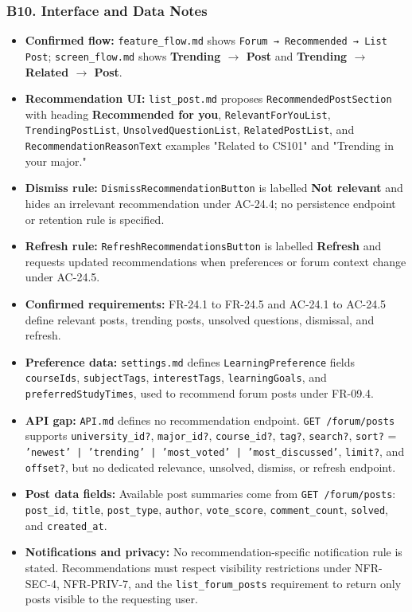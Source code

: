 \documentclass[12pt]{article}
\begin{document}
\hypertarget{sec:b10-interface-and-data-notes}{}
\subsubsection*{B10. Interface and Data Notes}
\par\medskip

\begin{itemize}
\item \textbf{Confirmed flow:} \texttt{feature\_flow.md} shows \texttt{Forum → Recommended → List Post}; \texttt{screen\_flow.md} shows \textbf{Trending $\rightarrow$ Post} and \textbf{Trending $\rightarrow$ Related $\rightarrow$ Post}.
\item \textbf{Recommendation UI:} \texttt{list\_post.md} proposes \texttt{RecommendedPostSection} with heading \textbf{Recommended for you}, \texttt{RelevantForYouList}, \texttt{TrendingPostList}, \texttt{UnsolvedQuestionList}, \texttt{RelatedPostList}, and \texttt{RecommendationReasonText} examples "Related to CS101" and "Trending in your major."
\item \textbf{Dismiss rule:} \texttt{DismissRecommendationButton} is labelled \textbf{Not relevant} and hides an irrelevant recommendation under AC-24.4; no persistence endpoint or retention rule is specified.
\item \textbf{Refresh rule:} \texttt{RefreshRecommendationsButton} is labelled \textbf{Refresh} and requests updated recommendations when preferences or forum context change under AC-24.5.
\item \textbf{Confirmed requirements:} FR-24.1 to FR-24.5 and AC-24.1 to AC-24.5 define relevant posts, trending posts, unsolved questions, dismissal, and refresh.
\item \textbf{Preference data:} \texttt{settings.md} defines \texttt{LearningPreference} fields \texttt{courseIds}, \texttt{subjectTags}, \texttt{interestTags}, \texttt{learningGoals}, and \texttt{preferredStudyTimes}, used to recommend forum posts under FR-09.4.
\item \textbf{API gap:} \texttt{API.md} defines no recommendation endpoint. \texttt{GET /forum/posts} supports \texttt{university\_id?}, \texttt{major\_id?}, \texttt{course\_id?}, \texttt{tag?}, \texttt{search?}, \texttt{sort?} = \texttt{'newest' | 'trending' | 'most\_voted' | 'most\_discussed'}, \texttt{limit?}, and \texttt{offset?}, but no dedicated relevance, unsolved, dismiss, or refresh endpoint.
\item \textbf{Post data fields:} Available post summaries come from \texttt{GET /forum/posts}: \texttt{post\_id}, \texttt{title}, \texttt{post\_type}, \texttt{author}, \texttt{vote\_score}, \texttt{comment\_count}, \texttt{solved}, and \texttt{created\_at}.
\item \textbf{Notifications and privacy:} No recommendation-specific notification rule is stated. Recommendations must respect visibility restrictions under NFR-SEC-4, NFR-PRIV-7, and the \texttt{list\_forum\_posts} requirement to return only posts visible to the requesting user.
\end{itemize}
\par\medskip
\end{document}
